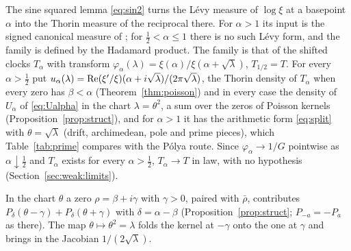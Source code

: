 The sine squared lemma \eqref{eq:sin2} \cite[Lemma 8.1]{P17} turns the L\'evy measure of $\log\xi$ at a basepoint $\alpha$ into the Thorin measure of the reciprocal there. For $\alpha>1$ its input is the signed canonical measure of \cite[Theorem 8.1]{P26}; for $\frac12<\alpha\le1$ there is no such L\'evy form, and the family is defined by the Hadamard product. The family is that of the shifted clocks $T_\alpha$ with transform $\varphi_\alpha(\lambda)=\xi(\alpha)/\xi(\alpha+\sqrt\lambda)$, $T_{1/2}=T$. For every $\alpha>\frac12$ put $u_\alpha(\lambda)=\operatorname{Re}(\xi'/\xi)(\alpha+i\sqrt\lambda)/(2\pi\sqrt\lambda)$, the Thorin density of $T_\alpha$ when every zero has $\beta<\alpha$ (Theorem~\ref{thm:poisson}) and in every case the density of $U_\alpha$ of \eqref{eq:Ualpha} in the chart $\lambda=\theta^2$, a sum over the zeros of Poisson kernels (Proposition~\ref{prop:struct}), and for $\alpha>1$ it has the arithmetic form \eqref{eq:split} with $\theta=\sqrt\lambda$ (drift, archimedean, pole and prime pieces), which Table~\ref{tab:prime} compares with the P\'olya route. Since $\varphi_\alpha\to1/G$ pointwise as $\alpha\downarrow\frac12$ and $T_\alpha$ exists for every $\alpha>\frac12$, $T_\alpha\to T$ in law, with no hypothesis (Section~\ref{sec:weak:limits}).

In the chart $\theta$ a zero $\rho=\beta+i\gamma$ with $\gamma>0$, paired with $\bar\rho$, contributes $P_\delta(\theta-\gamma)+P_\delta(\theta+\gamma)$ with $\delta=\alpha-\beta$ (Proposition~\ref{prop:struct}; $P_{-a}=-P_a$ as there). The map $\theta\mapsto\theta^2=\lambda$ folds the kernel at $-\gamma$ onto the one at $\gamma$ and brings in the Jacobian $1/(2\sqrt\lambda)$.

